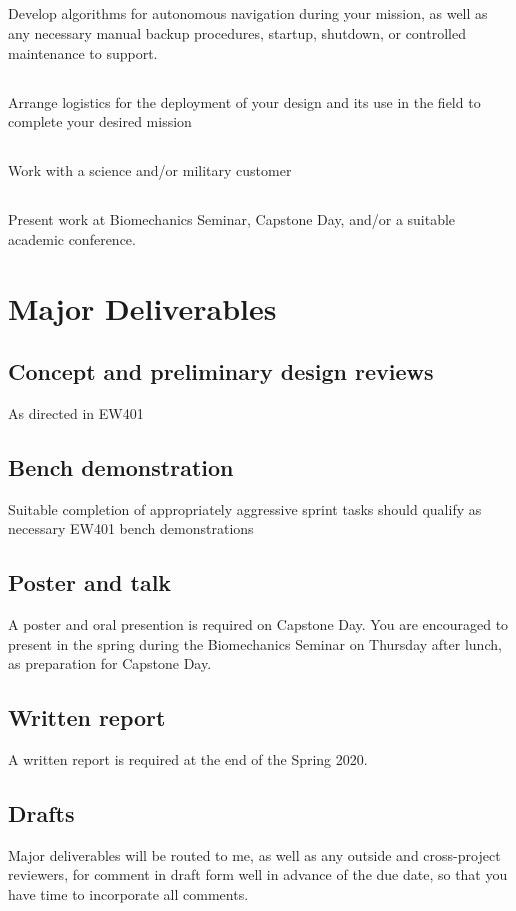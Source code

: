 \documentclass[10pt,courier]{navymemo}
\begin{document}
\subsection{} Develop algorithms for autonomous navigation during your mission, as well as any necessary manual backup procedures, startup, shutdown, or controlled maintenance to support. 
\subsection{} Arrange logistics for the deployment of your design and its use in the field to complete your desired mission
\subsection{} Work with a science and/or military customer
\subsection{} Present work at Biomechanics Seminar, Capstone Day, and/or a suitable academic conference. 

\section{Major Deliverables}
\subsection{Concept and preliminary design reviews} As directed in EW401
\subsection{Bench demonstration} Suitable completion of appropriately aggressive sprint tasks should qualify as necessary EW401 bench demonstrations
\subsection{Poster and talk} A poster and oral presention is required on Capstone Day. You are encouraged to present in the spring during the Biomechanics Seminar on Thursday after lunch, as preparation for Capstone Day.
\subsection{Written report} A written report is required at the end of the Spring 2020. 
\subsection{Drafts} Major deliverables will be routed to me, as well as any outside and cross-project reviewers, for comment in draft form well in advance of the due date, so that you have time to incorporate all comments. 
\end{document}
